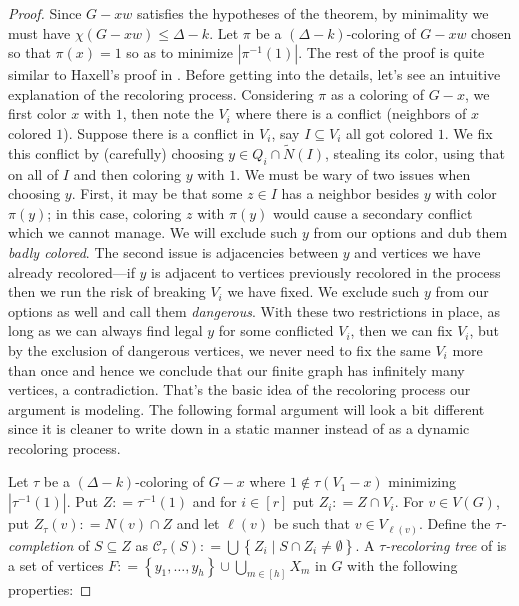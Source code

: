 \documentclass[12pt]{article}
\theoremstyle{plain}
\theoremstyle{definition}
\theoremstyle{remark}
\newcommand{\fancy}[1]{\mathcal{#1}}
\newcommand{\set}[1]{\left\{ #1 \right\}}
\newcommand{\setbs}[2]{\left\{ #1 \mid #2 \right\}}
\newcommand{\card}[1]{\left|#1\right|}
\newcommand{\irange}[1]{\left[#1\right]}
\newcommand{\nint}[1]{\widetilde{N}\left(#1\right)}
\newcommand{\DefinedAs}{\mathrel{\mathop:}=}
\begin{document}
\begin{proof}
Since $G - xw$ satisfies the hypotheses of the theorem, by minimality we must have $\chi(G - xw) \le \Delta - k$.  Let $\pi$ be a $(\Delta - k)$-coloring of $G-xw$ chosen so that $\pi(x) = 1$ so as to minimize $\card{\pi^{-1}(1)}$.  The rest of the proof is quite similar to Haxell's proof in \cite{haxell2004strong}.  Before getting into the details, let's see an intuitive explanation of the recoloring process. Considering $\pi$ as a coloring of $G-x$, we first color $x$ with $1$, then note the $V_i$ where there is a conflict (neighbors of $x$ colored $1$).  Suppose there is a conflict in $V_i$, say $I \subseteq V_i$ all got colored $1$.  We fix this conflict by (carefully) choosing $y \in Q_i \cap \nint{I}$, stealing its color, using that on all of $I$ and then coloring $y$ with $1$.  We must be wary of two issues when choosing $y$.  First, it may be that some $z \in I$ has a neighbor besides $y$ with color $\pi(y)$; in this case, coloring $z$ with $\pi(y)$ would cause a secondary conflict which we cannot manage.  We will exclude such $y$ from our options and dub them \emph{badly colored}.  The second issue is adjacencies between $y$ and vertices we have already recolored---if $y$ is adjacent to vertices previously recolored in the process then we run the risk of breaking $V_i$ we have fixed.  We exclude such $y$ from our options as well and call them \emph{dangerous}.  With these two restrictions in place, as long as we can always find legal $y$ for some conflicted $V_i$, then we can fix $V_i$, but by the exclusion of dangerous vertices, we never need to fix the same $V_i$ more than once and hence we conclude that our finite graph has infinitely many vertices, a contradiction.  That's the basic idea of the recoloring process our argument is modeling.  The following formal argument will look a bit different since it is cleaner to write down in a static manner instead of as a dynamic recoloring process.

Let $\tau$ be a $(\Delta - k)$-coloring of $G-x$ where $1 \not \in \tau(V_1 - x)$ minimizing $\card{\tau^{-1}(1)}$.  Put $Z \DefinedAs \tau^{-1}(1)$ and for $i \in \irange{r}$ put $Z_i \DefinedAs Z \cap V_i$. For $v \in V(G)$, put $Z_{\tau}(v) \DefinedAs N(v) \cap Z$ and let $\ell(v)$ be such that $v \in V_{\ell(v)}$. Define the \emph{$\tau$-completion} of $S \subseteq Z$ as $\fancy{C}_\tau(S) \DefinedAs \bigcup \setbs{Z_i}{S \cap Z_i \ne \emptyset}$.  A \emph{$\tau$-recoloring tree} of is a set of vertices $F \DefinedAs \set{y_1, \ldots, y_h} \cup \bigcup_{m \in \irange{h}} X_m$ in $G$ with the following properties:


\end{proof}
\end{document}
